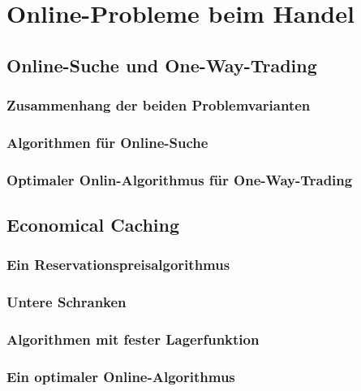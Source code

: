 \chapter{Online-Probleme beim Handel}


\section{Online-Suche und One-Way-Trading}

\subsection{Zusammenhang der beiden Problemvarianten}

\subsection{Algorithmen für Online-Suche}

\subsection{Optimaler Onlin-Algorithmus für One-Way-Trading}


\section{Economical Caching}

\subsection{Ein Reservationspreisalgorithmus}

\subsection{Untere Schranken}

\subsection{Algorithmen mit fester Lagerfunktion}

\subsection{Ein optimaler Online-Algorithmus}
